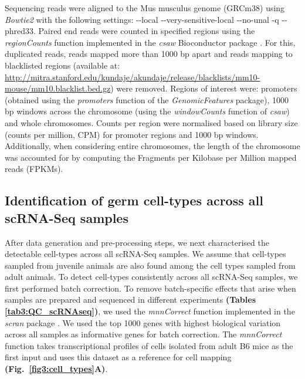 Sequencing reads were aligned to the Mus musculus genome (GRCm38) using \textit{Bowtie2} with the following settings: -{}-local -{}-very-sensitive-local -{}-no-unal -q -{}-phred33. Paired end reads were counted in specified regions using the \textit{regionCounts} function implemented in the \textit{csaw} Bioconductor package \citep{Lun2015}. For this, duplicated reads, reads mapped more than 1000 bp apart and reads mapping to blacklisted regions (available at: \url{http://mitra.stanford.edu/kundaje/akundaje/release/blacklists/mm10-mouse/mm10.blacklist.bed.gz}) were removed. Regions of interest were: promoters (obtained using the \textit{promoters} function of the \textit{GenomicFeatures} package), 1000 bp windows across the chromosome (using the \textit{windowCounts} function of \textit{csaw}) and whole chromosomes. Counts per region were normalised based on library size (counts per million, CPM) for promoter regions and 1000 bp windows. Additionally, when considering entire chromosomes, the length of the chromosome was accounted for by computing the Fragments per Kilobase per Million mapped reads (FPKMs). 

\newpage

\subsection{Identification of germ cell-types across all scRNA-Seq samples}
\label{sec3:clustering}

After data generation and pre-processing steps, we next characterised the detectable cell-types across all scRNA-Seq samples. We assume that cell-types sampled from juvenile animals are also found among the cell types sampled from adult animals. To detect cell-types consistently across all scRNA-Seq samples, we first performed batch correction. To remove batch-specific effects that arise when samples are prepared and sequenced in different experiments \textbf{(Tables \ref{tab3:QC_scRNAseq})}, we used the \emph{mnnCorrect} function implemented in the \emph{scran} package \citep{Haghverdi2018}. We used the top 1000 genes with highest biological variation across all samples as informative genes for batch correction. The \emph{mnnCorrect} function takes transcriptional profiles of cells isolated from adult B6 mice as the first input and uses this dataset as a reference for cell mapping \textbf{(Fig.~\ref{fig3:cell_types}A)}.\\

